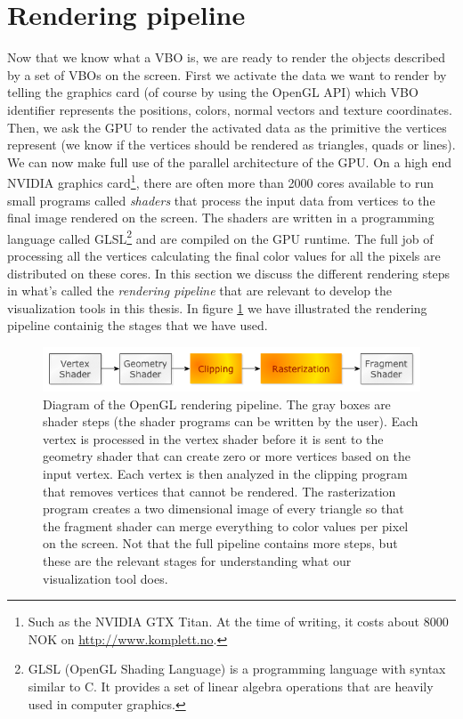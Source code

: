 \section{Rendering pipeline}
\label{sec:opengl_rendering_pipeline}
Now that we know what a VBO is, we are ready to render the objects described by a set of VBOs on the screen. First we activate the data we want to render by telling the graphics card (of course by using the OpenGL API) which VBO identifier represents the positions, colors, normal vectors and texture coordinates. Then, we ask the GPU to render the activated data as the primitive the vertices represent (we know if the vertices should be rendered as triangles, quads or lines).\\
We can now make full use of the parallel architecture of the GPU. On a high end NVIDIA graphics card\footnote{Such as the NVIDIA GTX Titan. At the time of writing, it costs about 8000 NOK on \url{http://www.komplett.no}.}, there are often more than 2000 cores available to run small programs called \textit{shaders} that process the input data from vertices to the final image rendered on the screen. The shaders are written in a programming language called GLSL\footnote{GLSL (OpenGL Shading Language) is a programming language with syntax similar to C. It provides a set of linear algebra operations that are heavily used in computer graphics.} and are compiled on the GPU runtime. The full job of processing all the vertices calculating the final color values for all the pixels are distributed on these cores. In this section we discuss the different rendering steps in what's called the \textit{rendering pipeline} that are relevant to develop the visualization tools in this thesis. In figure \ref{fig:opengl_rendering_pipeline} we have illustrated the rendering pipeline containig the stages that we have used. 
\begin{figure}[h]
\begin{center}
\includegraphics[width=\textwidth, trim=0cm 0cm 0cm 0cm, clip]{opengl/figures/pipeline.png}
\end{center}
\caption{Diagram of the OpenGL rendering pipeline. The gray boxes are shader steps (the shader programs can be written by the user). Each vertex is processed in the vertex shader before it is sent to the geometry shader that can create zero or more vertices based on the input vertex. Each vertex is then analyzed in the clipping program that removes vertices that cannot be rendered. The rasterization program creates a two dimensional image of every triangle so that the fragment shader can merge everything to color values per pixel on the screen. Not that the full pipeline contains more steps, but these are the relevant stages for understanding what our visualization tool does.}
\label{fig:opengl_rendering_pipeline}
\end{figure}
